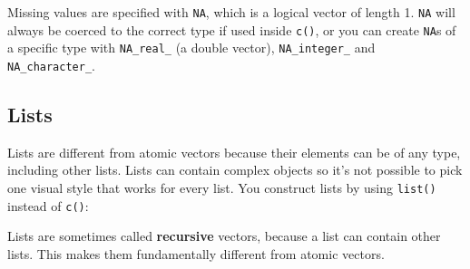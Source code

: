 \documentclass[]{book}
\newenvironment{Shaded}{\begin{snugshade}}{\end{snugshade}}
\newcommand{\KeywordTok}[1]{\textcolor[rgb]{0.13,0.29,0.53}{\textbf{#1}}}
\newcommand{\DecValTok}[1]{\textcolor[rgb]{0.00,0.00,0.81}{#1}}
\newcommand{\FloatTok}[1]{\textcolor[rgb]{0.00,0.00,0.81}{#1}}
\newcommand{\StringTok}[1]{\textcolor[rgb]{0.31,0.60,0.02}{#1}}
\newcommand{\CommentTok}[1]{\textcolor[rgb]{0.56,0.35,0.01}{\textit{#1}}}
\newcommand{\OtherTok}[1]{\textcolor[rgb]{0.56,0.35,0.01}{#1}}
\newcommand{\OperatorTok}[1]{\textcolor[rgb]{0.81,0.36,0.00}{\textbf{#1}}}
\newcommand{\NormalTok}[1]{#1}
\theoremstyle{definition}
\theoremstyle{definition}
\theoremstyle{definition}
\theoremstyle{remark}
\begin{document}
Missing values are specified with \texttt{NA}, which is a logical vector
of length 1. \texttt{NA} will always be coerced to the correct type if
used inside \texttt{c()}, or you can create \texttt{NA}s of a specific
type with \texttt{NA\_real\_} (a double vector), \texttt{NA\_integer\_}
and \texttt{NA\_character\_}.

\subsection{Lists}\label{lists}

Lists are different from atomic vectors because their elements can be of
any type, including other lists. Lists can contain complex objects so
it's not possible to pick one visual style that works for every list.
You construct lists by using \texttt{list()} instead of \texttt{c()}:

\begin{Shaded}
\end{Shaded}

Lists are sometimes called \textbf{recursive} vectors, because a list
can contain other lists. This makes them fundamentally different from
atomic vectors.

\begin{Shaded}
\end{Shaded}
\end{document}

